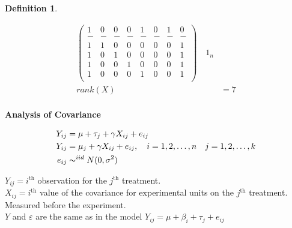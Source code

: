 \documentclass[11pt,a4paper]{article}
\theoremstyle{definition}
\newtheorem{defn}[thm]{Definition}
\newcommand{\subhead}[1]{%
  \par\medskip\noindent\textbf{#1}\par\nobreak\smallskip}
\begin{document}
\begin{defn}
\begin{enumerate}
\begin{align*}
\begin{pmatrix}
1 & 0 & 0 & 0 & 1 & 0 & 1 & 0\\
- & - & - & - & - & - & - & -\\
1 & 1 & 0 & 0 & 0 & 0 & 0 & 1\\
1 & 0 & 1 & 0 & 0 & 0 & 0 & 1\\
1 & 0 & 0 & 1 & 0 & 0 & 0 & 1\\
1 & 0 & 0 & 0 & 1 & 0 & 0 & 1\\
\end{pmatrix}
\quad  1_n\\
rank(X) & = 7\\
\end{align*}
\end{enumerate}


\subhead{Analysis of Covariance}
\begin{align*}
Y_{ij} & = \mu +\tau_j + \gamma X_{ij} + e_{ij}\\
Y_{ij} & = \mu_j +\gamma X_{ij} + e_{ij},\quad i=1,2,\ldots , n\quad  j=1,2,\ldots , k\\
e_{ij} & \thicksim^{iid} N(0,\sigma^2)
\end{align*}

$Y_{ij}=i^{\text{th}}$ observation for the $j^{\text{th}}$ treatment.\\

$X_{ij}=i^{\text{th}}$ value of the covariance for experimental units on the $j^{\text{th}}$ treatment. Measured before the experiment.\\

$Y$ and $\varepsilon$ are the same as in the model $Y_{ij}=\mu +\beta_i + \tau_j + e_{ij}$\\


\end{defn}
\end{document}
